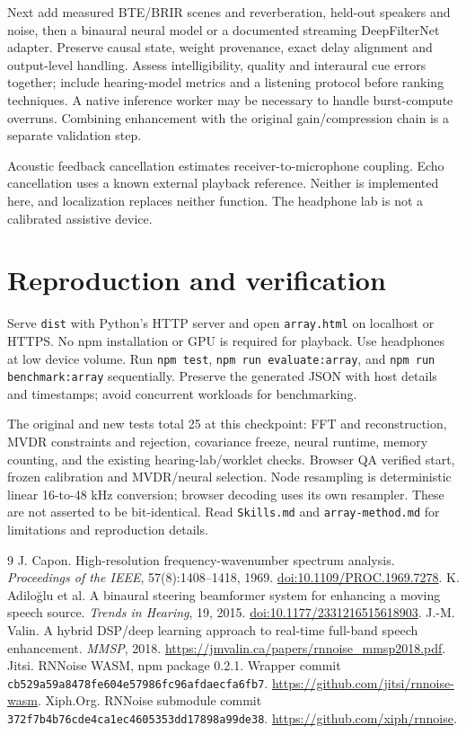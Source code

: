 \documentclass[11pt,a4paper]{article}
\begin{document}
Next add measured BTE/BRIR scenes and reverberation, held-out speakers and noise, then a binaural neural model or a documented streaming DeepFilterNet adapter. Preserve causal state, weight provenance, exact delay alignment and output-level handling. Assess intelligibility, quality and interaural cue errors together; include hearing-model metrics and a listening protocol before ranking techniques. A native inference worker may be necessary to handle burst-compute overruns. Combining enhancement with the original gain/compression chain is a separate validation step.

Acoustic feedback cancellation estimates receiver-to-microphone coupling. Echo cancellation uses a known external playback reference. Neither is implemented here, and localization replaces neither function. The headphone lab is not a calibrated assistive device.

\newpage
\section{Reproduction and verification}
Serve \texttt{dist} with Python's HTTP server and open \texttt{array.html} on localhost or HTTPS. No npm installation or GPU is required for playback. Use headphones at low device volume. Run \texttt{npm test}, \texttt{npm run evaluate:array}, and \texttt{npm run benchmark:array} sequentially. Preserve the generated JSON with host details and timestamps; avoid concurrent workloads for benchmarking.

The original and new tests total 25 at this checkpoint: FFT and reconstruction, MVDR constraints and rejection, covariance freeze, neural runtime, memory counting, and the existing hearing-lab/worklet checks. Browser QA verified start, frozen calibration and MVDR/neural selection. Node resampling is deterministic linear 16-to-48 kHz conversion; browser decoding uses its own resampler. These are not asserted to be bit-identical. Read \texttt{Skills.md} and \texttt{array-method.md} for limitations and reproduction details.

\begin{thebibliography}{9}\small
{} J. Capon. High-resolution frequency-wavenumber spectrum analysis. \emph{Proceedings of the IEEE}, 57(8):1408--1418, 1969. \href{https://doi.org/10.1109/PROC.1969.7278}{doi:10.1109/PROC.1969.7278}.
 K. Adilo\u glu et al. A binaural steering beamformer system for enhancing a moving speech source. \emph{Trends in Hearing}, 19, 2015. \href{https://doi.org/10.1177/2331216515618903}{doi:10.1177/2331216515618903}.
 J.-M. Valin. A hybrid DSP/deep learning approach to real-time full-band speech enhancement. \emph{MMSP}, 2018. \url{https://jmvalin.ca/papers/rnnoise_mmsp2018.pdf}.
 Jitsi. RNNoise WASM, npm package 0.2.1. Wrapper commit \texttt{cb529a59a8478fe604e57986fc96afdaecfa6fb7}. \url{https://github.com/jitsi/rnnoise-wasm}.
 Xiph.Org. RNNoise submodule commit \texttt{372f7b4b76cde4ca1ec4605353dd17898a99de38}. \url{https://github.com/xiph/rnnoise}.
\end{thebibliography}
\end{document}
